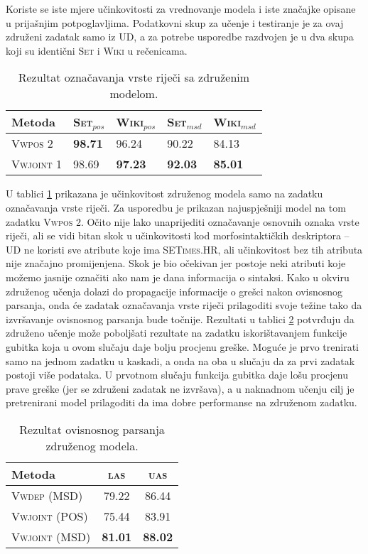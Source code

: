 Koriste se iste mjere učinkovitosti za vrednovanje modela i iste značajke
opisane u prijašnjim potpoglavljima. Podatkovni skup za učenje i testiranje je
za ovaj združeni zadatak samo iz UD, a za potrebe usporedbe razdvojen je u dva
skupa koji su identični \textsc{Set} i \textsc{Wiki} u rečenicama.

\begin{table}[]
\centering
\caption{Rezultat označavanja vrste riječi sa združenim modelom.}
\label{table:taggingjoint}
\begin{tabular}{|l|l|l|l|l|}
\hline
Metoda             & \textsc{Set$_{pos}$} & \textsc{Wiki$_{pos}$} & \textsc{Set$_{msd}$} & \textsc{Wiki$_{msd}$} \\ \hline \hline
\textsc{Vwpos 2}   & \textbf{98.71}       & 96.24                 & 90.22                & 84.13                 \\
\textsc{Vwjoint 1} & 98.69                & \textbf{97.23}        & \textbf{92.03}       & \textbf{85.01}        \\ \hline
\end{tabular}
\end{table}

U tablici \ref{table:taggingjoint} prikazana je učinkovitost združenog modela
samo na zadatku označavanja vrste riječi. Za usporedbu je prikazan najuspješniji
model na tom zadatku \textsc{Vwpos 2}. Očito nije lako unaprijediti označavanje
osnovnih oznaka vrste riječi, ali se vidi bitan skok u učinkovitosti kod
morfosintaktičkih deskriptora -- UD ne koristi sve atribute koje ima
\textsc{SETimes.HR}, ali učinkovitost bez tih atributa nije značajno
promijenjena. Skok je bio očekivan jer postoje neki atributi koje možemo jasnije
označiti ako nam je dana informacija o sintaksi. Kako u okviru združenog učenja
dolazi do propagacije informacije o grešci nakon ovisnosnog parsanja, onda će
zadatak označavanja vrste riječi prilagoditi svoje težine tako da izvršavanje
ovisnosnog parsanja bude točnije. Rezultati u tablici
\ref{table:depparsing:joint} potvrđuju da združeno učenje može poboljšati
rezultate na zadatku iskorištavanjem funkcije gubitka koja u ovom slučaju daje
bolju procjenu greške. Moguće je prvo trenirati samo na jednom zadatku u
kaskadi, a onda na oba u slučaju da za prvi zadatak postoji više podataka. U
prvotnom slučaju funkcija gubitka daje lošu procjenu prave greške (jer se
združeni zadatak ne izvršava), a u naknadnom učenju cilj je pretrenirani model
prilagoditi da ima dobre performanse na združenom zadatku.

\begin{table}[]
\centering
\caption{Rezultat ovisnosnog parsanja združenog modela.}
\label{table:depparsing:joint}
\begin{tabular}{|l|c|c|}
\hline
Metoda                 & \textsc{las}   & \textsc{uas}    \\ \hline \hline
\textsc{Vwdep}   (MSD) & 79.22          & 86.44           \\
\textsc{Vwjoint} (POS) & 75.44          & 83.91           \\
\textsc{Vwjoint} (MSD) & \textbf{81.01} & \textbf{88.02}  \\ \hline
\end{tabular}
\end{table}
